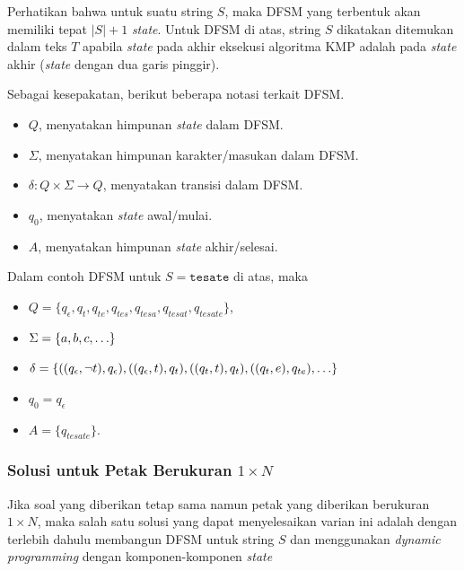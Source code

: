 \documentclass[../main_editorial.tex]{subfiles} %
\begin{document}
Perhatikan bahwa untuk suatu string $ S $, maka DFSM yang terbentuk akan memiliki tepat $ |S| + 1 $ \textit{state}. Untuk DFSM di atas, string $ S $ dikatakan ditemukan dalam teks $ T $ apabila \textit{state} pada akhir eksekusi algoritma KMP adalah pada \textit{state} akhir (\textit{state} dengan dua garis pinggir).

Sebagai kesepakatan, berikut beberapa notasi terkait DFSM.

\begin{itemize}
\item $ Q $, menyatakan himpunan \textit{state} dalam DFSM.
\item $ \Sigma $, menyatakan himpunan karakter/masukan dalam DFSM.
\item $ \delta : Q \times \Sigma \rightarrow Q $, menyatakan transisi dalam DFSM.
\item $ q_0 $, menyatakan \textit{state} awal/mulai.
\item $ A $, menyatakan himpunan \textit{state} akhir/selesai.
\end{itemize}

Dalam contoh DFSM untuk $ S = \texttt{tesate} $ di atas, maka

\begin{itemize}
\item
$ Q = \{q_\epsilon, q_t, q_{te}, q_{tes}, q_{tesa}, q_{tesat}, q_{tesate}\} $,
\item 
$ \Sigma = \{a, b, c, \mathellipsis\} $
\item
$ \delta = \{((q_\epsilon, \lnot t), q_\epsilon), ((q_\epsilon, t), q_t), ((q_t, t), q_t), ((q_t, e), q_{te}), \mathellipsis\} $
\item $ q_0 = q_\epsilon $
\item $ A = \{q_{tesate}\} $.
\end{itemize}

\subsubsection*{Solusi untuk Petak Berukuran $ 1 \times N $}

Jika soal yang diberikan tetap sama namun petak yang diberikan berukuran $ 1 \times N $, maka salah satu solusi yang dapat menyelesaikan varian ini adalah dengan terlebih dahulu membangun DFSM untuk string $ S $ dan menggunakan \textit{dynamic programming} dengan komponen-komponen \textit{state}
\end{document}

